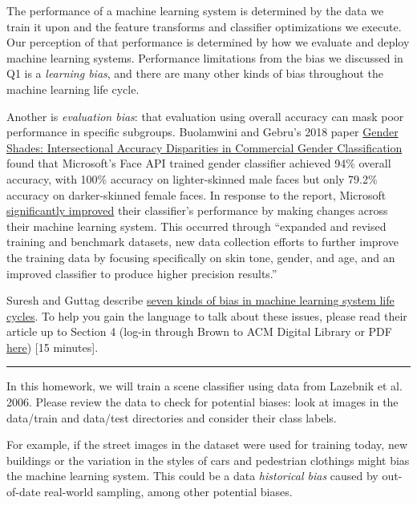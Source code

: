 \documentclass{csci1430}
\begin{document}
\pagebreak
\begin{question}[points=12,drawbox=false]
The performance of a machine learning system is determined by the data we train it upon and the feature transforms and classifier optimizations we execute. Our perception of that performance is determined by how we evaluate and deploy machine learning systems. Performance limitations from the bias we discussed in Q1 is a \emph{learning bias}, and there are many other kinds of bias throughout the machine learning life cycle.

Another is \emph{evaluation bias}: that evaluation using overall accuracy can mask poor performance in specific subgroups.
Buolamwini and Gebru's 2018 paper \href{http://proceedings.mlr.press/v81/buolamwini18a/buolamwini18a.pdf}{Gender Shades: Intersectional Accuracy Disparities in Commercial Gender Classification} found that Microsoft's Face API trained gender classifier achieved 94\% overall accuracy, with 100\% accuracy on lighter-skinned male faces but only 79.2\% accuracy on darker-skinned female faces. In response to the report, Microsoft \href{https://blogs.microsoft.com/ai/gender-skin-tone-facial-recognition-improvement/}{significantly improved} their classifier's performance by making changes across their machine learning system. This occurred through ``expanded and revised training and benchmark datasets, new data collection efforts to further improve the training data by focusing specifically on skin tone, gender, and age, and an improved classifier to produce higher precision results.''

Suresh and Guttag describe \href{https://dl.acm.org/doi/10.1145/3465416.3483305}{seven kinds of bias in machine learning system life cycles}. To help you gain the language to talk about these issues, please read their article up to Section 4 (log-in through Brown to ACM Digital Library or PDF \href{https://drive.google.com/file/d/10YdCwZ0E0XBYS3oj_hfeI0TQ6lpepGKK/view}{here}) [15 minutes].

\vspace{3ex}
\hrule
\vspace{1ex}

In this homework, we will train a scene classifier using data from Lazebnik et al. 2006. Please review the data to check for potential biases: look at images in the data/train and data/test directories and consider their class labels. 

For example, if the street images in the dataset were used for training today, new buildings or the variation in the styles of cars and pedestrian clothings might bias the machine learning system. This could be a data \emph{historical bias} caused by out-of-date real-world sampling, among other potential biases. 
\end{question}
\end{document}
